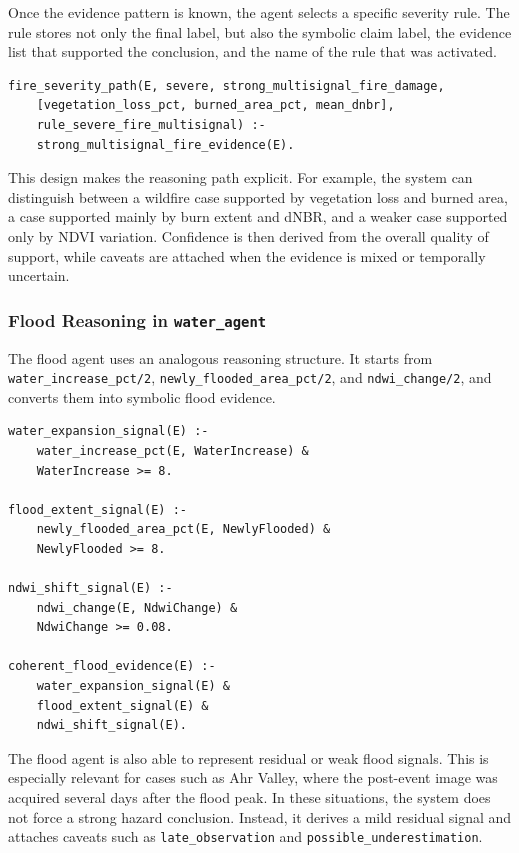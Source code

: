 \documentclass[11pt,a4paper]{article}
\begin{document}
Once the evidence pattern is known, the agent selects a specific severity rule. The rule stores not only the final label, but also the symbolic claim label, the evidence list that supported the conclusion, and the name of the rule that was activated.

\begin{lstlisting}
fire_severity_path(E, severe, strong_multisignal_fire_damage,
    [vegetation_loss_pct, burned_area_pct, mean_dnbr],
    rule_severe_fire_multisignal) :-
    strong_multisignal_fire_evidence(E).
\end{lstlisting}

This design makes the reasoning path explicit. For example, the system can distinguish between a wildfire case supported by vegetation loss and burned area, a case supported mainly by burn extent and dNBR, and a weaker case supported only by NDVI variation. Confidence is then derived from the overall quality of support, while caveats are attached when the evidence is mixed or temporally uncertain.

\subsubsection{Flood Reasoning in \texttt{water\_agent}}

The flood agent uses an analogous reasoning structure. It starts from \texttt{water\_increase\_pct/2}, \texttt{newly\_flooded\_area\_pct/2}, and \texttt{ndwi\_change/2}, and converts them into symbolic flood evidence.

\begin{lstlisting}
water_expansion_signal(E) :-
    water_increase_pct(E, WaterIncrease) &
    WaterIncrease >= 8.

flood_extent_signal(E) :-
    newly_flooded_area_pct(E, NewlyFlooded) &
    NewlyFlooded >= 8.

ndwi_shift_signal(E) :-
    ndwi_change(E, NdwiChange) &
    NdwiChange >= 0.08.

coherent_flood_evidence(E) :-
    water_expansion_signal(E) &
    flood_extent_signal(E) &
    ndwi_shift_signal(E).
\end{lstlisting}

The flood agent is also able to represent residual or weak flood signals. This is especially relevant for cases such as Ahr Valley, where the post-event image was acquired several days after the flood peak. In these situations, the system does not force a strong hazard conclusion. Instead, it derives a mild residual signal and attaches caveats such as \texttt{late\_observation} and \texttt{possible\_underestimation}.
\end{document}

